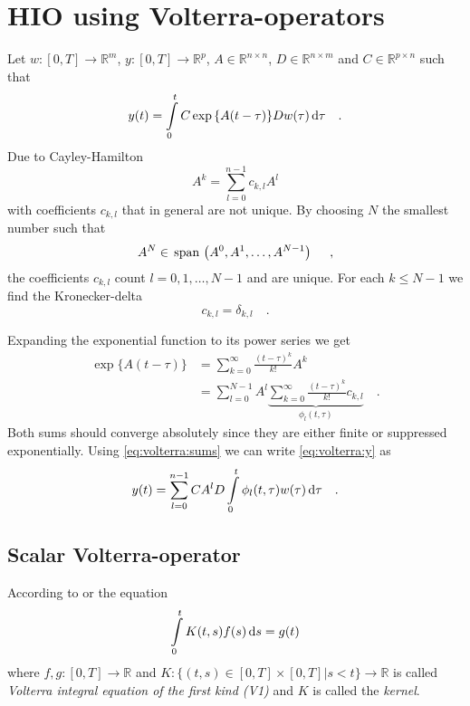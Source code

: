 \section{HIO using Volterra-operators}
Let $w:[0,T]\rightarrow \mathbb{R}^m$, $y:[0,T]\rightarrow \mathbb{R}^p$, 
$A\in \mathbb{R}^{n\times n}$, $D\in\mathbb{R}^{n\times m}$ and $C\in\mathbb{R}^{p\times n}
$ such that 
\begin{equation}
y(t) = \int\limits_0^t C \exp{\left\{A(t-\tau)\right\}} D w(\tau) \, \text{d} \tau \quad .
\label{eq:volterra:y}
\end{equation}
Due to Cayley-Hamilton
\begin{equation}
A^k = \sum\limits_{l=0}^{n-1} c_{k,l} A^l \label{eq:volterra:cayley-hamilton}
\end{equation}
with coefficients $c_{k,l}$ that in general are not unique. By choosing $N$ the 
smallest number such that
\begin{equation}
A^N \in  \, \text{span}\,\left(A^0,A^1,\ldots,A^{N-1} \right) \,\, \quad ,
\end{equation}
the coefficients $c_{k,l}$ count $l=0,1,\ldots,N-1$ and are unique. For each $k\leq 
N-1$ we find the Kronecker-delta
\begin{equation}
c_{k,l} = \delta_{k,l} \quad . \label{eq:volterra:cayley-hamilton_unique}
\end{equation}

Expanding the exponential function to its power series we get
\begin{equation}
\begin{aligned}
\exp\{ A(t-\tau) \} &= \sum\limits_{k=0}^\infty \frac{(t-\tau)^k}{k!} A^k \\
&= \sum\limits_{l=0}^{N-1}  A^l \underbrace{\sum\limits_{k=0}^\infty \frac{(t-\tau)^k}
{k!}  
c_{k,l}}_{\phi_l(t,\tau)} \quad .
\end{aligned} \label{eq:volterra:sums}
\end{equation}
Both sums should converge absolutely since they are either finite or suppressed 
exponentially. Using \eqref{eq:volterra:sums} we can write \eqref{eq:volterra:y} as
\begin{equation}
y(t) = \sum\limits_{l=0}^{n-1} CA^lD \int\limits_0^t \phi_l(t,\tau) w(\tau) \, \text{d}\tau
\quad . \label{eq:volterra:y_volterra}
\end{equation}

\subsection{Scalar Volterra-operator}
\begin{definition}
According to \cite{Heuser} or \cite{Kirsch} the equation
\begin{equation}
\int\limits_0^t K(t,s) f(s) \, \text{d} s =  g(t) \label{eq:volterra:definition}
\end{equation}
where $f,g:[0,T] \rightarrow \mathbb{R}$ and $K:\{ (t,s)\in [0,T]\times [0,T] | 
s<t\}\rightarrow \mathbb{R}$ is called \textit{Volterra integral equation of the 
first kind (V1)} and $K$ is called the \textit{kernel}.
\end{definition}

